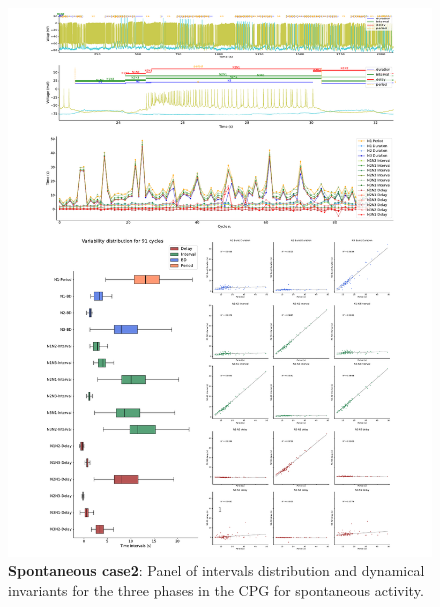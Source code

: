 \begin{figure}[htbp]
	\centering
	\includegraphics[width=1.1\textwidth]{./invariants/data/SUSSEX/prep2/images/3phases/panel_with_intervals.pdf}
	\caption{\textbf{Spontaneous case2}: Panel of intervals distribution and dynamical invariants for the three phases in the CPG for spontaneous activity.}
	\label{fig:prep2 invariants}
\end{figure}

